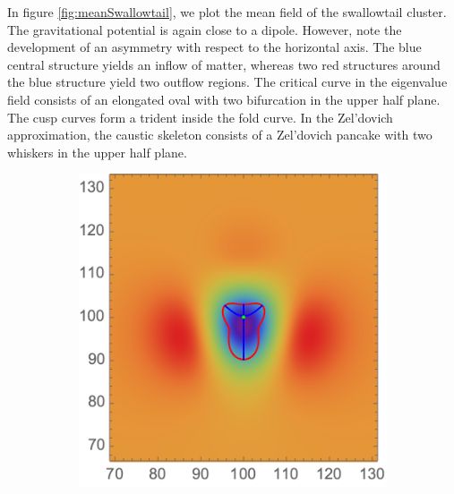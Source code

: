 \documentclass[a4paper, 11pt]{article}
\begin{document}
In figure \ref{fig:meanSwallowtail}, we plot the mean field of the swallowtail cluster. The gravitational potential is again close to a dipole. However, note the development of an asymmetry with respect to the horizontal axis. The blue central structure yields an inflow of matter, whereas two red structures around the blue structure yield two outflow regions. The critical curve in the eigenvalue field consists of an elongated oval with two bifurcation in the upper half plane. The cusp curves form a trident inside the fold curve. In the Zel'dovich approximation, the caustic skeleton consists of a Zel'dovich pancake with two whiskers in the upper half plane. 



\begin{figure}
\centering
\begin{subfigure}[b]{0.32\textwidth}
\includegraphics[width=\textwidth]{Swallowtail_mean_Phi}
\end{subfigure}~
\begin{subfigure}[b]{0.32\textwidth}

\end{subfigure}
\end{figure}
\end{document}
